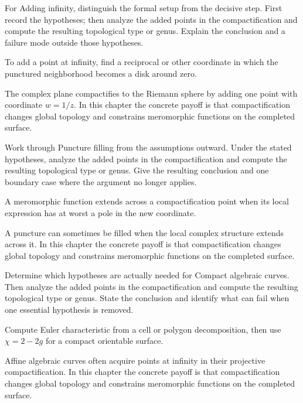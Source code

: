 \begin{exercise}\label{exr:iv26-01}
For Adding infinity, distinguish the formal setup from the decisive step. First record the hypotheses; then analyze the added points in the compactification and compute the resulting topological type or genus. Explain the conclusion and a failure mode outside those hypotheses.
\end{exercise}
\begin{hint}
To add a point at infinity, find a reciprocal or other coordinate in which the punctured neighborhood becomes a disk around zero.
\end{hint}
\begin{solution}
The complex plane compactifies to the Riemann sphere by adding one point with coordinate $w=1/z$. In this chapter the concrete payoff is that compactification changes global topology and constrains meromorphic functions on the completed surface.
\end{solution}

\begin{exercise}\label{exr:iv26-02}
Work through Puncture filling from the assumptions outward. Under the stated hypotheses, analyze the added points in the compactification and compute the resulting topological type or genus. Give the resulting conclusion and one boundary case where the argument no longer applies.
\end{exercise}
\begin{hint}
A meromorphic function extends across a compactification point when its local expression has at worst a pole in the new coordinate.
\end{hint}
\begin{solution}
A puncture can sometimes be filled when the local complex structure extends across it. In this chapter the concrete payoff is that compactification changes global topology and constrains meromorphic functions on the completed surface.
\end{solution}

\begin{exercise}\label{exr:iv26-03}
Determine which hypotheses are actually needed for Compact algebraic curves. Then analyze the added points in the compactification and compute the resulting topological type or genus. State the conclusion and identify what can fail when one essential hypothesis is removed.
\end{exercise}
\begin{hint}
Compute Euler characteristic from a cell or polygon decomposition, then use \(\chi=2-2g\) for a compact orientable surface.
\end{hint}
\begin{solution}
Affine algebraic curves often acquire points at infinity in their projective compactification. In this chapter the concrete payoff is that compactification changes global topology and constrains meromorphic functions on the completed surface.
\end{solution}

